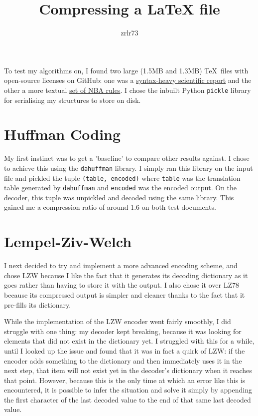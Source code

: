 \documentclass[11pt]{article} %
\title{\vspace{-1.6cm}Compressing a LaTeX file}
\author{zrlr73}
\date{} %
\begin{document}
\maketitle


	To test my algorithms on, I found two large (1.5MB and 1.3MB) \rmfamily\TeX\normalfont\ files with open-source licenses on GitHub: one was a \href{https://github.com/robertgj/DesignOfIIRFilters/blob/master/DesignOfIIRFilters.tex}{syntax-heavy scientific report} and the other a more textual \href{https://github.com/atlhawksfanatic/NBA-CBA/blob/master/docs/nba-cba-2017.tex}{set of NBA rules}. I chose the inbuilt Python \verb|pickle| library for serialising my structures to store on disk.


\section{Huffman Coding}

My first instinct was to get a 'baseline' to compare other results against. I chose to achieve this using the \verb|dahuffman| library. I simply ran this library on the input file and pickled the tuple \verb|(table, encoded)| where \verb|table| was the translation table generated by \verb|dahuffman| and \verb|encoded| was the encoded output. On the decoder, this tuple was unpickled and decoded using the same library. This gained me a compression ratio of around 1.6 on both test documents.


\section{Lempel-Ziv-Welch}

I next decided to try and implement a more advanced encoding scheme, and chose LZW because I like the fact that it generates its decoding dictionary as it goes rather than having to store it with the output. I also chose it over LZ78 because its compressed output is simpler and cleaner thanks to the fact that it pre-fills its dictionary.

While the implementation of the LZW encoder went fairly smoothly, I did struggle with one thing: my decoder kept breaking, because it was looking for elements that did not exist in the dictionary yet. I struggled with this for a while, until I looked up the issue and found that it was in fact a quirk of LZW: if the encoder adds something to the dictionary and then immediately uses it in the next step, that item will not exist yet in the decoder's dictionary when it reaches that point. However, because this is the only time at which an error like this is encountered, it is possible to infer the situation and solve it simply by appending the first character of the last decoded value to the end of that same last decoded value.
\end{document}
